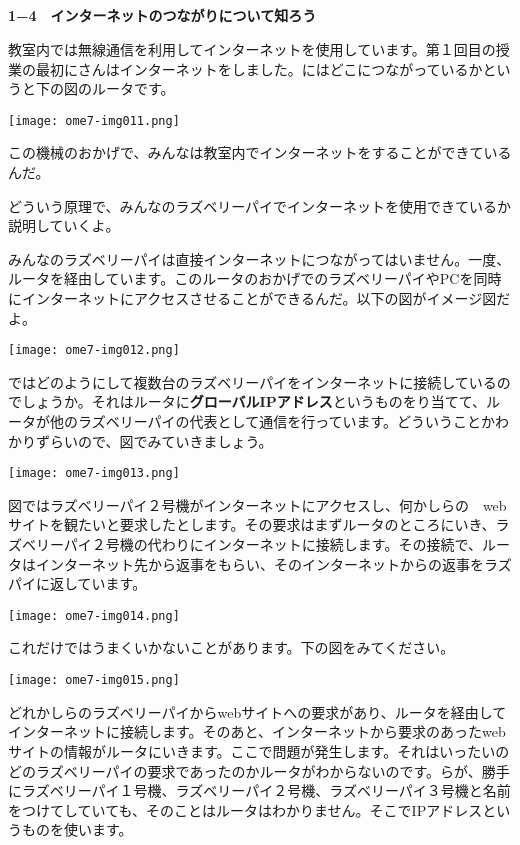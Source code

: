 \subsection*{\bfseries }
\clearpage
\textbf{1−4　インターネットのつながりについて知ろう}

教室内では無線通信を利用してインターネットを使用しています。第１回目の授業の最初にさんはインターネットをしました。にはどこにつながっているかというと下の図のルータです。

\centering
\texttt{[image: ome7-img011.png]}
\flushleft

この機械のおかげで、みんなは教室内でインターネットをすることができているんだ。

どういう原理で、みんなのラズベリーパイでインターネットを使用できているか説明していくよ。

みんなのラズベリーパイは直接インターネットにつながってはいません。一度、ルータを経由しています。このルータのおかげでのラズベリーパイやPCを同時にインターネットにアクセスさせることができるんだ。以下の図がイメージ図だよ。

\centering
\texttt{[image: ome7-img012.png]}
\flushleft

ではどのようにして複数台のラズベリーパイをインターネットに接続しているのでしょうか。それはルータに\textbf{グローバルIPアドレス}というものをり当てて、ルータが他のラズベリーパイの代表として通信を行っています。どういうことかわかりずらいので、図でみていきましょう。

\centering
\texttt{[image: ome7-img013.png]}
\flushleft

図ではラズベリーパイ２号機がインターネットにアクセスし、何かしらの　webサイトを観たいと要求したとします。その要求はまずルータのところにいき、ラズベリーパイ２号機の代わりにインターネットに接続します。その接続で、ルータはインターネット先から返事をもらい、そのインターネットからの返事をラズパイに返しています。

\centering
\texttt{[image: ome7-img014.png]}
\flushleft

\clearpage
これだけではうまくいかないことがあります。下の図をみてください。

\centering
\texttt{[image: ome7-img015.png]}
\flushleft

どれかしらのラズベリーパイからwebサイトへの要求があり、ルータを経由してインターネットに接続します。そのあと、インターネットから要求のあったwebサイトの情報がルータにいきます。ここで問題が発生します。それはいったいのどのラズベリーパイの要求であったのかルータがわからないのです。らが、勝手にラズベリーパイ１号機、ラズベリーパイ２号機、ラズベリーパイ３号機と名前をつけてしていても、そのことはルータはわかりません。そこでIPアドレスというものを使います。

